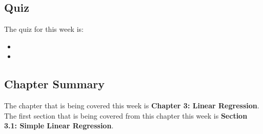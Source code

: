 \subsection{Quiz}

The quiz for this week is:

\begin{itemize}
    \item {}
    \item {}
\end{itemize}

\newpage

\subsection{Chapter Summary}

The chapter that is being covered this week is \textbf{Chapter 3: Linear Regression}. The first section that is being covered from this chapter this week is
\textbf{Section 3.1: Simple Linear Regression}.

